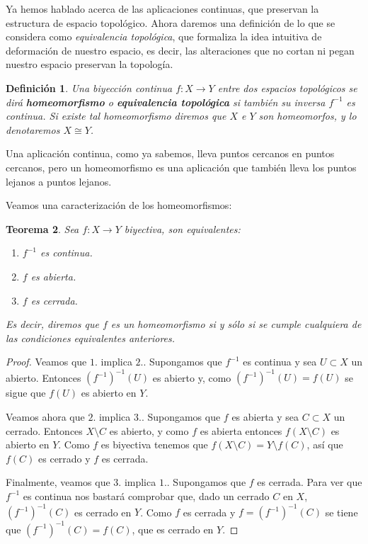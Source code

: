 \documentclass[12pt]{article}
\newtheorem{theorem}{Teorema}[section]
\newtheorem{definition}[theorem]{Definición}
\begin{document}
Ya hemos hablado acerca de las aplicaciones continuas, que preservan la estructura de espacio topológico. Ahora daremos una definición de lo que se considera como \textit{equivalencia topológica}, que formaliza la idea intuitiva de deformación de nuestro espacio, es decir, las alteraciones que no cortan ni pegan nuestro espacio preservan la topología.

\begin{definition}Una biyección continua $f \colon X \longrightarrow Y$ entre dos espacios topológicos se dirá \textbf{homeomorfismo} o \textbf{equivalencia topológica} si también su inversa $f^{-1}$ es continua. Si existe tal homeomorfismo diremos que $X$ e $Y$ son homeomorfos, y lo denotaremos $X \cong Y$.
\end{definition}

Una aplicación continua, como ya sabemos, lleva puntos cercanos en puntos cercanos, pero un homeomorfismo es una aplicación que también lleva los puntos lejanos a puntos lejanos.

Veamos una caracterización de los homeomorfismos:

\begin{theorem}
Sea $f \colon X \longrightarrow Y$ biyectiva, son equivalentes: 
\begin{enumerate}
\item $f^{-1}$ es continua.
\item $f$ es abierta.
\item $f$ es cerrada.
\end{enumerate}

Es decir, diremos que $f$ es un homeomorfismo si y sólo si se cumple cualquiera de las condiciones equivalentes anteriores.
\end{theorem}
\begin{proof}
Veamos que $1.$ implica $2.$. Supongamos que $f^{-1}$ es continua y sea $U \subset X$ un abierto. Entonces $(f^{-1})^{-1}(U)$ es abierto y, como $(f^{-1})^{-1}(U) = f(U)$ se sigue que $f(U)$ es abierto en $Y$.

Veamos ahora que $2.$ implica $3.$. Supongamos que $f$ es abierta y sea $C \subset X$ un cerrado. Entonces $X \setminus C$ es abierto, y como $f$ es abierta entonces $f(X \setminus C)$ es abierto en $Y$. Como $f$ es biyectiva tenemos que $f(X \setminus C) = Y \setminus f(C)$, así que $f(C)$ es cerrado y $f$ es cerrada.

Finalmente, veamos que $3.$ implica $1.$. Supongamos que $f$ es cerrada. Para ver que $f^{-1}$ es continua nos bastará comprobar que, dado un cerrado $C$ en $X$, $(f^{-1})^{-1}(C)$ es cerrado en $Y$. Como $f$ es cerrada y $f=(f^{-1})^{-1}(C)$ se tiene que $(f^{-1})^{-1}(C) = f(C)$, que es cerrado en $Y$.

\end{proof}
\end{document}

